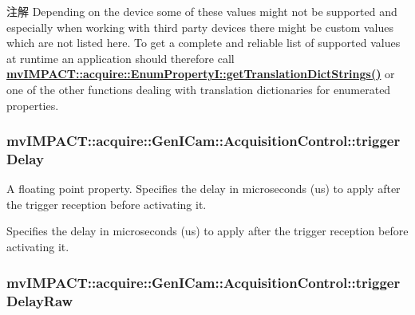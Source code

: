 \begin{DoxyNote}{注解}
Depending on the device some of these values might not be supported and especially when working with third party devices there might be custom values which are not listed here. To get a complete and reliable list of supported values at runtime an application should therefore call {\bfseries \hyperlink{classmv_i_m_p_a_c_t_1_1acquire_1_1_enum_property_i_a0ba6ccbf5ee69784d5d0b537924d26b6}{mv\+I\+M\+P\+A\+C\+T\+::acquire\+::\+Enum\+Property\+I\+::get\+Translation\+Dict\+Strings()}} or one of the other functions dealing with translation dictionaries for enumerated properties. 
\end{DoxyNote}
\hypertarget{classmv_i_m_p_a_c_t_1_1acquire_1_1_gen_i_cam_1_1_acquisition_control_a0c0123d1c00bac1adba870bc11368080}{
\subsubsection[{trigger\+Delay}]{ mv\+I\+M\+P\+A\+C\+T\+::acquire\+::\+Gen\+I\+Cam\+::\+Acquisition\+Control\+::trigger\+Delay}}\label{classmv_i_m_p_a_c_t_1_1acquire_1_1_gen_i_cam_1_1_acquisition_control_a0c0123d1c00bac1adba870bc11368080}


A floating point property. Specifies the delay in microseconds (us) to apply after the trigger reception before activating it. 

Specifies the delay in microseconds (us) to apply after the trigger reception before activating it. \hypertarget{classmv_i_m_p_a_c_t_1_1acquire_1_1_gen_i_cam_1_1_acquisition_control_ad96d0a854c6dcc41256849ea89d706d3}{
\subsubsection[{trigger\+Delay\+Raw}]{ mv\+I\+M\+P\+A\+C\+T\+::acquire\+::\+Gen\+I\+Cam\+::\+Acquisition\+Control\+::trigger\+Delay\+Raw}}\label{classmv_i_m_p_a_c_t_1_1acquire_1_1_gen_i_cam_1_1_acquisition_control_ad96d0a854c6dcc41256849ea89d706d3}


